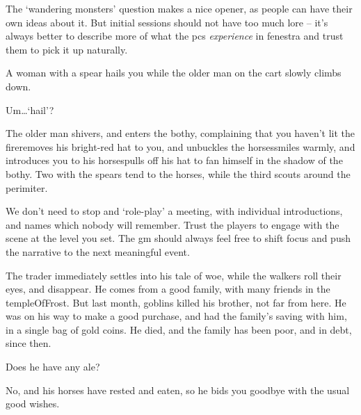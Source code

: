 \begin{multicols}{2}
\bigLine
\vspace{2em}

\noindent
The `wandering monsters' question makes a nice opener, as people can have their own ideas about it.
But initial sessions should not have too much lore -- it's always better to describe more of what the \glspl{pc} \emph{experience} in \gls{fenestra} and trust them to pick it up naturally.

\bigLine

\begin{description}\sf
  \item[\Glsentrytext{gm}:]
  A woman with a spear hails you while the older man on the cart slowly climbs down.
  \item[Player 3:]
  Um\ldots `hail'?
  \item[\Glsentrytext{gm}:]
  The older man \ifcase\value{temperature} shivers, and enters the \gls{bothy}, complaining that you haven't lit the fire\or removes his bright-red hat to you, and unbuckles the horses\or smiles warmly, and introduces you to his horses\else pulls off his hat to fan himself in the shadow of the \gls{bothy}\fi.
  Two with the spears tend to the horses, while the third scouts around the perimiter.
\end{description}

\bigLine
\vspace{2em}

\noindent
We don't need to stop and `role-play' a meeting, with individual introductions, and  names which nobody will remember.
Trust the players to engage with the scene at the level you set.
  The \gls{gm} should always feel free to shift focus and push the narrative to the next meaningful event.

\bigLine

\begin{description}\sf
  \item[\Glsentrytext{gm}:]
  The trader immediately settles into his tale of woe, while the walkers roll their eyes, and disappear.
  He comes from a good family, with many friends in the \gls{templeOfFrost}.
  But last month, goblins killed his brother, not far from here.
  He was on his way to make a good purchase, and had the family's saving with him, in a single bag of gold coins.
  He died, and the family has been poor, and in debt, since then.
  \item[Player 2:]
  Does he have any ale?
  \item[\Glsentrytext{gm}:]
  No, and his horses have rested and eaten, so he bids you goodbye with the usual good wishes.


\end{description}
\end{multicols}
